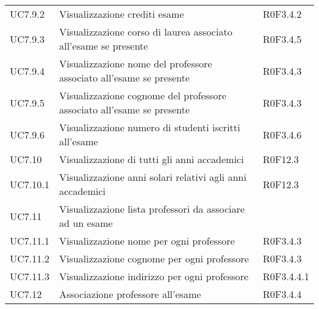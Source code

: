 \documentclass[AnalisiDeiRequisiti.tex]{subfiles}
\begin{document}
\begin{longtable}[H]{p{2cm}p{5cm}p{5cm}}
	UC7.9.2 & Visualizzazione crediti esame & R0F3.4.2 \\
	UC7.9.3 & Visualizzazione corso di laurea associato all'esame se presente & R0F3.4.5 \\
	UC7.9.4 & Visualizzazione nome del professore associato all'esame se presente & R0F3.4.3 \\
	UC7.9.5 & Visualizzazione cognome del professore associato all'esame se presente & R0F3.4.3 \\
	UC7.9.6 & Visualizzazione numero di studenti iscritti all'esame & R0F3.4.6 \\
	UC7.10 & Visualizzazione di tutti gli anni accademici & R0F12.3 \\
	UC7.10.1 & Visualizzazione anni solari relativi agli anni accademici & R0F12.3 \\
	UC7.11 & Visualizzazione lista professori da associare ad un esame &  \\
	UC7.11.1 & Visualizzazione nome per ogni professore & R0F3.4.3 \\
	UC7.11.2 & Visualizzazione cognome per ogni professore & R0F3.4.3 \\
	UC7.11.3 & Visualizzazione indirizzo per ogni professore & R0F3.4.4.1 \\
	UC7.12 & Associazione professore all'esame & R0F3.4.4 \\
	
	
	
	
	

\end{longtable}
\end{document}
